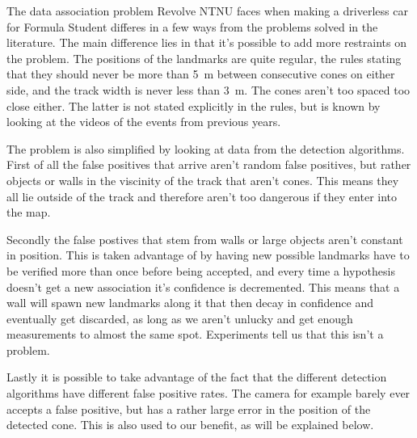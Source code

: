 The data association problem Revolve NTNU faces when making a driverless car for Formula Student differes in a few ways from the problems solved in the literature. The main difference lies in that it's possible to add more restraints on the problem. The positions of the landmarks are quite regular, the rules stating that they should never be more than \SI{5}{\meter} between consecutive cones on either side, and the track width is never less than \SI{3}{\meter}. The cones aren't too spaced too close either. The latter is not stated explicitly in the rules, but is known by looking at the videos of the events from previous years. 

The problem is also simplified by looking at data from the detection algorithms. First of all the false positives that arrive aren't random false positives, but rather objects or walls in the viscinity of the track that aren't cones. This means they all lie outside of the track and therefore aren't too dangerous if they enter into the map. 

Secondly the false postives that stem from walls or large objects aren't constant in position. This is taken advantage of by having new possible landmarks have to be verified more than once before being accepted, and every time a hypothesis doesn't get a new association it's confidence is decremented. This means that a wall will spawn new landmarks along it that then decay in confidence and eventually get discarded, as long as we aren't unlucky and get enough measurements to almost the same spot. Experiments tell us that this isn't a problem. 

Lastly it is possible to take advantage of the fact that the different detection algorithms have different false positive rates. The camera for example barely ever accepts a false positive, but has a rather large error in the position of the detected cone. This is also used to our benefit, as will be explained below. 
